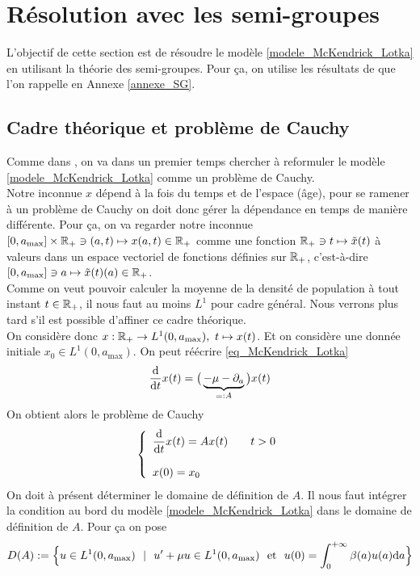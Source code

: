 \section{Résolution avec les semi-groupes}
L'objectif de cette section est de résoudre le modèle \eqref{modele_McKendrick_Lotka} en utilisant la théorie des semi-groupes. Pour ça, on utilise les résultats de \cite{Pazy1983} que l'on rappelle en Annexe \ref{annexe_SG}.

\subsection{Cadre théorique et problème de Cauchy}
Comme dans \cite[p.~100]{Pazy1983}, on va dans un premier temps chercher à reformuler le modèle \eqref{modele_McKendrick_Lotka} comme un problème de Cauchy. 
\\
Notre inconnue $x$ dépend à la fois du temps et de \og l'espace \fg{} (âge), pour se ramener à un problème de Cauchy on doit donc gérer la dépendance en temps de manière différente. Pour ça, on va \og regarder \fg{} notre inconnue $[0,a_{\max}] \times \mathbb{R}_+ \ni (a,t) \mapsto x(a,t) \in \mathbb{R}_+$ comme une fonction $\mathbb{R}_+ \ni t \mapsto \tilde{x}(t)$ à valeurs dans un espace vectoriel de fonctions définies sur $\mathbb{R}_+$, c'est-à-dire $[0,a_{\max}] \ni a \mapsto \tilde{x}(t)(a) \in \mathbb{R}_+$.
\\
Comme on veut pouvoir calculer la moyenne de la densité de population à tout instant $t \in \mathbb{R}_+$, il nous faut au moins $L^1$ pour cadre général. Nous verrons plus tard s'il est possible d'affiner ce cadre théorique.
\\
On considère donc $x : \mathbb{R}_+ \rightarrow L^1(0,a_{\max}), \ t \mapsto x(t)$. Et on considère une donnée initiale $x_0 \in L^1(0,a_{\max})$. On peut réécrire \eqref{eq_McKendrick_Lotka}
\begin{equation*}
    \frac{\mathrm{d}}{\mathrm{d} t}x(t) = \big(\underbrace{-\mu - \partial_a}_{=:A}\big) x(t)
\end{equation*}
On obtient alors le problème de Cauchy
\begin{equation}\label{pbmCauchy_SG}
    \left\{\begin{array}{lr}
        \dfrac{\mathrm{d}}{\mathrm{d} t}x(t) = Ax(t) & \ \ \ t >0 \\
        & \\
        x(0) = x_0 &
    \end{array}\right.
\end{equation}
On doit à présent déterminer le domaine de définition de $A$. Il nous faut intégrer la condition au bord du modèle \eqref{modele_McKendrick_Lotka} dans le domaine de définition de $A$. Pour ça on pose
\begin{equation*}
    D(A) := \Big\{ u \in L^{1}(0,a_{\max}) \ \ | \ \ u'+\mu u \in L^1(0,a_{\max}) \ \text{ et } \ u(0) = \int_0^{+\infty}\beta(a)u(a)\d a \Big\}
\end{equation*}

